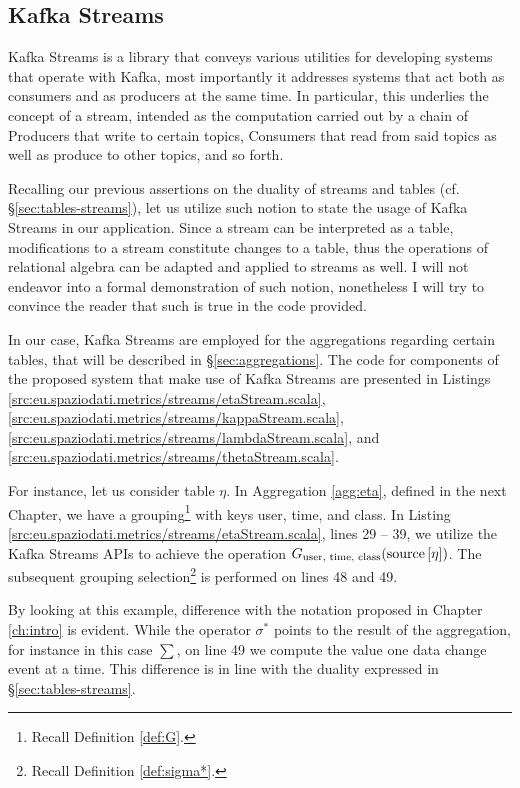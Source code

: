 \subsection{Kafka Streams}
\label{sec:kafka-streams}

Kafka Streams is a library that conveys various utilities for developing systems that operate with Kafka, most importantly it addresses systems that act both as consumers and as producers at the same time.
In particular, this underlies the concept of a stream, intended as the computation carried out by a chain of Producers that write to certain topics, Consumers that read from said topics as well as produce to other topics, and so forth.

Recalling our previous assertions on the duality of streams and tables (cf. \S \ref{sec:tables-streams}), let us utilize such notion to state the usage of Kafka Streams in our application.
Since a stream can be interpreted as a table, modifications to a stream constitute changes to a table, thus the operations of relational algebra can be adapted and applied to streams as well.
I will not endeavor into a formal demonstration of such notion, nonetheless I will try to convince the reader that such is true in the code provided.

In our case, Kafka Streams are employed for the aggregations regarding certain tables, that will be described in \S \ref{sec:aggregations}.
The code for components of the proposed system that make use of Kafka Streams are presented in Listings \ref{src:eu.spaziodati.metrics/streams/etaStream.scala}, \ref{src:eu.spaziodati.metrics/streams/kappaStream.scala},
\ref{src:eu.spaziodati.metrics/streams/lambdaStream.scala}, and
\ref{src:eu.spaziodati.metrics/streams/thetaStream.scala}.

For instance, let us consider table $\eta$. In Aggregation \ref{agg:eta}, defined in the next Chapter, we have a grouping\footnote{%
	Recall Definition \ref{def:G}.
} with keys user, time, and class. In Listing \ref{src:eu.spaziodati.metrics/streams/etaStream.scala}, lines 29 -- 39, we utilize the Kafka Streams APIs to achieve the operation $G_{\text{user, time, class}}(\text{source}\left[{\eta}\right])$.
The subsequent grouping selection\footnote{%
	Recall Definition \ref{def:sigma*}.
} is performed on lines 48 and 49.

By looking at this example, difference with the notation proposed in Chapter \ref{ch:intro} is evident.
While the operator $\sigma^*$ points to the result of the aggregation, for instance in this case $\sum$, on line 49 we compute the value one data change event at a time.
This difference is in line with the duality expressed in \S \ref{sec:tables-streams}.


